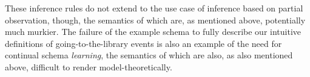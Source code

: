 These inference rules do not extend to the use case of inference based on partial observation, though, the semantics of which are, as mentioned above, potentially much murkier. The failure of the example schema to fully describe our intuitive definitions of going-to-the-library events is also an example of the need for continual schema \textit{learning}, the semantics of which are also, as also mentioned above, difficult to render model-theoretically.
